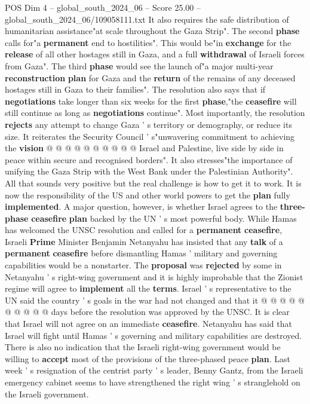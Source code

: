 \begin{textsample}{POS Dim 4 – global\_south\_2024\_06 – Score 25.00 – global\_south\_2024\_06/109058111.txt}
It also requires the safe distribution of humanitarian assistance"at scale throughout the Gaza Strip".
The second \textbf{phase} calls for"a \textbf{permanent} end to hostilities".
This would be"in \textbf{exchange} for the \textbf{release} of all other hostages still in Gaza, and a full \textbf{withdrawal} of Israeli forces from Gaza".
The third \textbf{phase} would see the launch of"a major multi-year \textbf{reconstruction} \textbf{plan} for Gaza and the \textbf{return} of the remains of any deceased hostages still in Gaza to their families".
The resolution also says that if \textbf{negotiations} take longer than six weeks for the first \textbf{phase},"the \textbf{ceasefire} will still continue as long as \textbf{negotiations} continue".
Most importantly, the resolution \textbf{rejects} any attempt to change Gaza ' s territory or demography, or reduce its size.
It reiterates the Security Council ' s"unwavering commitment to achieving the \textbf{vision} @ @ @ @ @ @ @ @ @ @ Israel and Palestine, live side by side in peace within secure and recognised borders".
It also stresses"the importance of unifying the Gaza Strip with the West Bank under the Palestinian Authority".
All that sounds very positive but the real challenge is how to get it to work.
It is now the responsibility of the US and other world powers to get the \textbf{plan} fully \textbf{implemented}.
A major question, however, is whether Israel agrees to the \textbf{three-phase} \textbf{ceasefire} \textbf{plan} backed by the UN ' s most powerful body.
While Hamas has welcomed the UNSC resolution and called for a \textbf{permanent} \textbf{ceasefire}, Israeli \textbf{Prime} Minister Benjamin Netanyahu has insisted that any \textbf{talk} of a \textbf{permanent} \textbf{ceasefire} before dismantling Hamas ' military and governing capabilities would be a nonstarter.
The \textbf{proposal} was \textbf{rejected} by some in Netanyahu ' s right-wing government and it is highly improbable that the Zionist regime will agree to \textbf{implement} all the \textbf{terms}.
Israel ' s representative to the UN said the country ' s goals in the war had not changed and that it @ @ @ @ @ @ @ @ @ @ days before the resolution was approved by the UNSC.
It is clear that Israel will not agree on an immediate \textbf{ceasefire}.
Netanyahu has said that Israel will fight until Hamas ' s governing and military capabilities are destroyed.
There is also no indication that the Israeli right-wing government would be willing to \textbf{accept} most of the provisions of the three-phased peace \textbf{plan}.
Last week ' s resignation of the centrist party ' s leader, Benny Gantz, from the Israeli emergency cabinet seems to have strengthened the right wing ' s stranglehold on the Israeli government.

\end{textsample}
